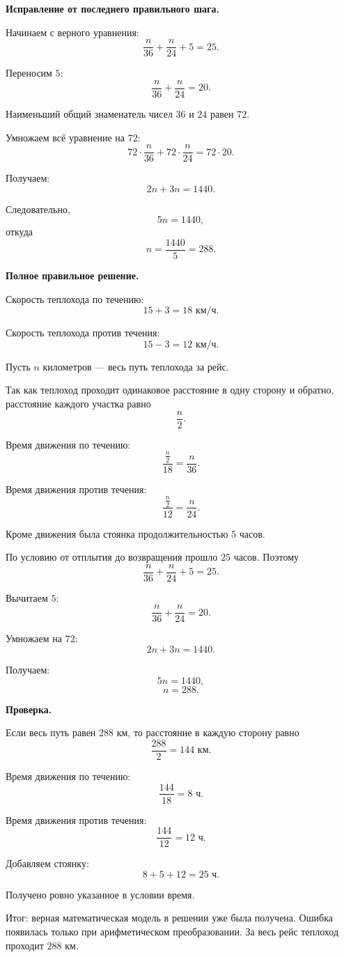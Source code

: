 \documentclass[12pt,a4paper]{article}
\newcommand{\resultlabel}[1]{\textcolor{reviewteal!80!black}{Итог:} #1}
\begin{document}
\textbf{Исправление от последнего правильного шага.}

Начинаем с верного уравнения:
\[
\frac{n}{36}+\frac{n}{24}+5=25.
\]

Переносим $5$:
\[
\frac{n}{36}+\frac{n}{24}=20.
\]

Наименьший общий знаменатель чисел $36$ и $24$ равен $72$.

Умножаем всё уравнение на $72$:
\[
72\cdot\frac{n}{36}
+
72\cdot\frac{n}{24}
=
72\cdot20.
\]

Получаем:
\[
2n+3n=1440.
\]

Следовательно,
\[
5n=1440,
\]
откуда
\[
n=\frac{1440}{5}=288.
\]

\textbf{Полное правильное решение.}

Скорость теплохода по течению:
\[
15+3=18\text{ км/ч}.
\]

Скорость теплохода против течения:
\[
15-3=12\text{ км/ч}.
\]

Пусть $n$ километров --- весь путь теплохода за рейс.

Так как теплоход проходит одинаковое расстояние в одну сторону и обратно,
расстояние каждого участка равно
\[
\frac{n}{2}.
\]

Время движения по течению:
\[
\frac{\frac n2}{18}
=
\frac{n}{36}.
\]

Время движения против течения:
\[
\frac{\frac n2}{12}
=
\frac{n}{24}.
\]

Кроме движения была стоянка продолжительностью $5$ часов.

По условию от отплытия до возвращения прошло $25$ часов. Поэтому
\[
\frac{n}{36}+\frac{n}{24}+5=25.
\]

Вычитаем $5$:
\[
\frac{n}{36}+\frac{n}{24}=20.
\]

Умножаем на $72$:
\[
2n+3n=1440.
\]

Получаем:
\[
5n=1440,
\]
\[
n=288.
\]

\textbf{Проверка.}

Если весь путь равен $288$ км, то расстояние в каждую сторону равно
\[
\frac{288}{2}=144\text{ км}.
\]

Время движения по течению:
\[
\frac{144}{18}=8\text{ ч}.
\]

Время движения против течения:
\[
\frac{144}{12}=12\text{ ч}.
\]

Добавляем стоянку:
\[
8+5+12=25\text{ ч}.
\]

Получено ровно указанное в условии время.

\resultlabel{ верная математическая модель в решении уже была получена. Ошибка появилась только при арифметическом преобразовании. За весь рейс теплоход проходит $288$ км.}
\end{document}
